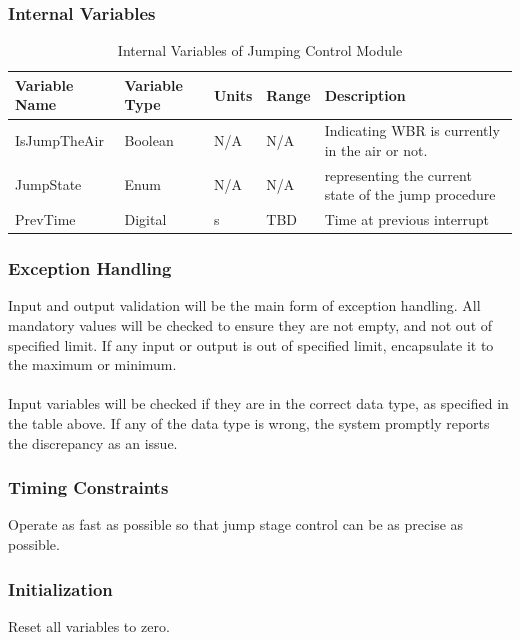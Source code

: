 \documentclass[12pt]{article}
\begin{document}
        \subsubsection{Internal Variables}
            \begin{table}[H]
              \centering
                \caption{Internal Variables of Jumping Control Module} \label{tbl:Internal Variables of Jumping Control Module}
              \begin{tabularx}{\textwidth}{|p{5.5cm}|p{1.2cm}|p{1.2cm}|p{1cm}|X|}
                \hline Variable Name & Variable Type & Units & Range & Description \\
                \hline IsJumpTheAir & Boolean & N/A &N/A &  Indicating WBR is currently in the air or not.\\
                \hline JumpState &Enum &N/A &N/A & representing the current state of the jump procedure\\
                \hline PrevTime & Digital & s & TBD & Time at previous interrupt\\
                \hline
              \end{tabularx}
            \end{table}

        \subsubsection{Exception Handling}
            Input and output validation will be the main form of exception handling. All mandatory values will be checked to ensure they are not empty, and not out of specified limit. If any input or output is out of specified limit, encapsulate it to the maximum or minimum.\\\\
            Input variables will be checked if they are in the correct data type, as specified in the table above. If any of the data type is wrong, the system promptly reports the discrepancy as an issue.
        \subsubsection{Timing Constraints}
            Operate as fast as possible so that jump stage control can be as precise as possible.
        \subsubsection{Initialization}
            Reset all variables to zero.
\end{document}
